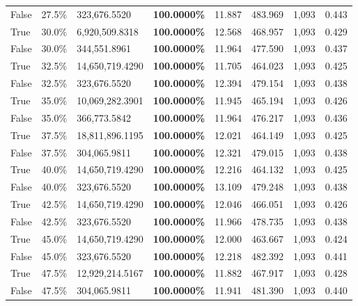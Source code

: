 \begin{table}[H]
\begin{tabular}{lllrllll}
\cline{1-8}
False & 27.5\% & 323,676.5520 & \bfseries \color{red} 100.0000\% & 11.887 & 483.969 & 1,093 & 0.443 \\
\cline{1-8}
True & 30.0\% & 6,920,509.8318 & \bfseries \color{red} 100.0000\% & 12.568 & 468.957 & 1,093 & 0.429 \\
\cline{1-8}
False & 30.0\% & 344,551.8961 & \bfseries \color{red} 100.0000\% & 11.964 & 477.590 & 1,093 & 0.437 \\
\cline{1-8}
True & 32.5\% & 14,650,719.4290 & \bfseries \color{red} 100.0000\% & 11.705 & 464.023 & 1,093 & 0.425 \\
\cline{1-8}
False & 32.5\% & 323,676.5520 & \bfseries \color{red} 100.0000\% & 12.394 & 479.154 & 1,093 & 0.438 \\
\cline{1-8}
True & 35.0\% & 10,069,282.3901 & \bfseries \color{red} 100.0000\% & 11.945 & 465.194 & 1,093 & 0.426 \\
\cline{1-8}
False & 35.0\% & 366,773.5842 & \bfseries \color{red} 100.0000\% & 11.964 & 476.217 & 1,093 & 0.436 \\
\cline{1-8}
True & 37.5\% & 18,811,896.1195 & \bfseries \color{red} 100.0000\% & 12.021 & 464.149 & 1,093 & 0.425 \\
\cline{1-8}
False & 37.5\% & 304,065.9811 & \bfseries \color{red} 100.0000\% & 12.321 & 479.015 & 1,093 & 0.438 \\
\cline{1-8}
True & 40.0\% & 14,650,719.4290 & \bfseries \color{red} 100.0000\% & 12.216 & 464.132 & 1,093 & 0.425 \\
\cline{1-8}
False & 40.0\% & 323,676.5520 & \bfseries \color{red} 100.0000\% & 13.109 & 479.248 & 1,093 & 0.438 \\
\cline{1-8}
True & 42.5\% & 14,650,719.4290 & \bfseries \color{red} 100.0000\% & 12.046 & 466.051 & 1,093 & 0.426 \\
\cline{1-8}
False & 42.5\% & 323,676.5520 & \bfseries \color{red} 100.0000\% & 11.966 & 478.735 & 1,093 & 0.438 \\
\cline{1-8}
True & 45.0\% & 14,650,719.4290 & \bfseries \color{red} 100.0000\% & 12.000 & 463.667 & 1,093 & 0.424 \\
\cline{1-8}
False & 45.0\% & 323,676.5520 & \bfseries \color{red} 100.0000\% & 12.218 & 482.392 & 1,093 & 0.441 \\
\cline{1-8}
True & 47.5\% & 12,929,214.5167 & \bfseries \color{red} 100.0000\% & 11.882 & 467.917 & 1,093 & 0.428 \\
\cline{1-8}
False & 47.5\% & 304,065.9811 & \bfseries \color{red} 100.0000\% & 11.941 & 481.390 & 1,093 & 0.440 \\

\end{tabular}
\end{table}
